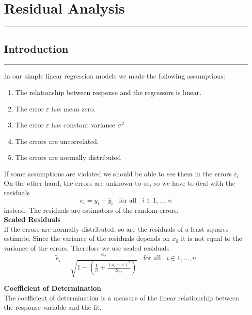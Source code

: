 \section{Residual Analysis}
\noindent\rule[\linienAbstand]{\linewidth}{\linienDickeDick}


\subsection{Introduction}
\noindent\rule[\linienAbstand]{\linewidth}{\linienDicke}
In our simple linear regression models we made the following assumptions:
\begin{enumerate}
  \item The relationship between response and the regressors is linear.
  \item The error $\varepsilon$ has mean zero.
  \item The error $\varepsilon$ has constant variance $\sigma^2$
  \item The errors are uncorrelated.
  \item The errors are normally distributed
\end{enumerate}
If some assumptions are violated we should be able to see them in the errors $\varepsilon_i$. On the other hand, the errors are unknown to us, so we have to deal with the residuals
\begin{equation}
  e_i = y_i - \hat{y}_i \;\;\;\text{for all}\;\;\; i \in {1,...,n}
\end{equation}
instead. The residuals are estimators of the random errors.\\

\textbf{Scaled Residuals}\\
If the errors are normally distributed, so are the residuals of a least-squares estimate. Since the variance of the residuals depends on $x_0$ it is not equal to the variance of the errors. Therefore we use scaled residuals
\begin{equation}
  \tilde{e}_i = \frac{e_i}{\sqrt{1 - \left(\frac{1}{n} + \frac{(x_i - \bar{x})^2}{S_{xx}}\right)}} \;\;\;\text{for all}\;\;\; i \in {1,...,n}
\end{equation}


\textbf{Coefficient of Determination}\\
The coefficient of determination is a measure of the linear relationship between the response variable and the fit.\\

